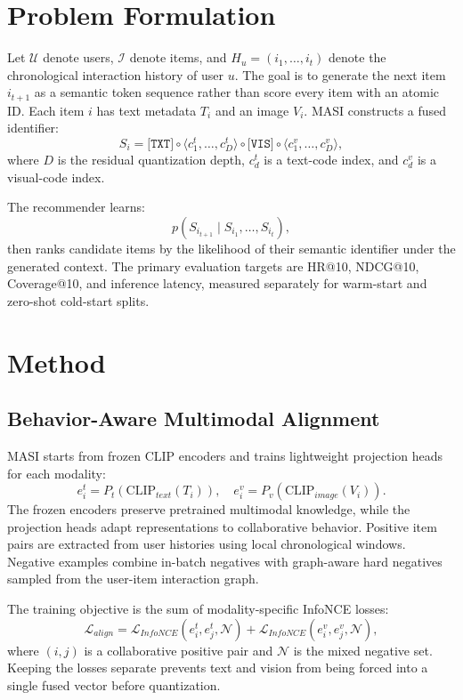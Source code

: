 \documentclass[conference]{IEEEtran}
\begin{document}
\section{Problem Formulation}
Let $\mathcal{U}$ denote users, $\mathcal{I}$ denote items, and $H_u = (i_1,\ldots,i_t)$ denote the chronological interaction history of user $u$. The goal is to generate the next item $i_{t+1}$ as a semantic token sequence rather than score every item with an atomic ID. Each item $i$ has text metadata $T_i$ and an image $V_i$. MASI constructs a fused identifier:
\begin{equation}
S_i =
\texttt{[TXT]} \circ \langle c^t_1,\ldots,c^t_D\rangle
\circ \texttt{[VIS]} \circ \langle c^v_1,\ldots,c^v_D\rangle,
\end{equation}
where $D$ is the residual quantization depth, $c^t_d$ is a text-code index, and $c^v_d$ is a visual-code index.

The recommender learns:
\begin{equation}
p(S_{i_{t+1}} \mid S_{i_1}, \ldots, S_{i_t}),
\end{equation}
then ranks candidate items by the likelihood of their semantic identifier under the generated context. The primary evaluation targets are HR@10, NDCG@10, Coverage@10, and inference latency, measured separately for warm-start and zero-shot cold-start splits.

\section{Method}
\subsection{Behavior-Aware Multimodal Alignment}
MASI starts from frozen CLIP encoders and trains lightweight projection heads for each modality:
\begin{equation}
e^t_i = P_t(\mathrm{CLIP}_{text}(T_i)),
\quad
e^v_i = P_v(\mathrm{CLIP}_{image}(V_i)).
\end{equation}
The frozen encoders preserve pretrained multimodal knowledge, while the projection heads adapt representations to collaborative behavior. Positive item pairs are extracted from user histories using local chronological windows. Negative examples combine in-batch negatives with graph-aware hard negatives sampled from the user-item interaction graph.

The training objective is the sum of modality-specific InfoNCE losses:
\begin{equation}
\mathcal{L}_{align} =
\mathcal{L}_{InfoNCE}(e^t_i,e^t_j,\mathcal{N})
+
\mathcal{L}_{InfoNCE}(e^v_i,e^v_j,\mathcal{N}),
\end{equation}
where $(i,j)$ is a collaborative positive pair and $\mathcal{N}$ is the mixed negative set. Keeping the losses separate prevents text and vision from being forced into a single fused vector before quantization.
\end{document}
